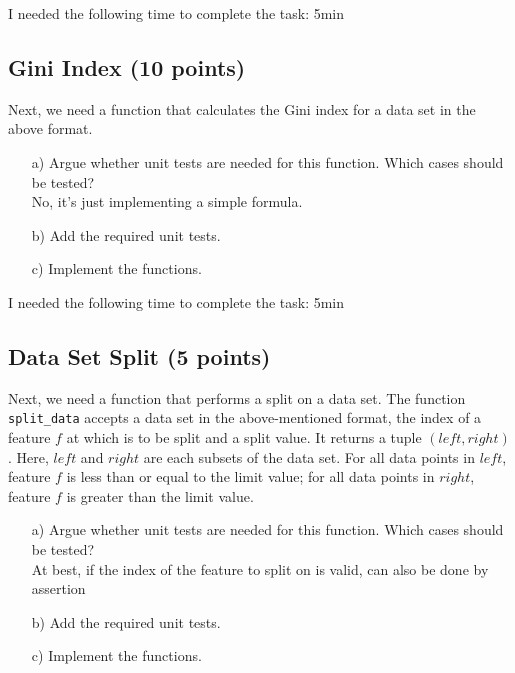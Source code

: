 I needed the following time to complete the task: 5min

\subsection{Gini Index (10 points)}

Next, we need a function that calculates the Gini index for a data set in the above format. 

\begin{enumerate}

\item[a)] Argue whether unit tests are needed for this function. Which cases should be tested?\\
No, it's just implementing a simple formula.

\item[b)] Add the required unit tests.

\item[c)] Implement the functions.

\end{enumerate}

I needed the following time to complete the task: 5min

\subsection{Data Set Split (5 points)}

Next, we need a function that performs a split on a data set. The function \texttt{split\_data} accepts a data set in the above-mentioned format, the index of a feature $f$ at which
is to be split and a split value. It returns a tuple $(left, right)$. Here, $left$ and $right$ are each subsets of the data set. For all data points in $left$, feature $f$ is less than or equal to the limit value; for all data points in $right$, feature $f$ is greater than the limit value.

\begin{enumerate}

\item[a)] Argue whether unit tests are needed for this function. Which cases should be tested?\\
At best, if the index of the feature to split on is valid, can also be done by assertion

\item[b)] Add the required unit tests.

\item[c)] Implement the functions.

\end{enumerate}

